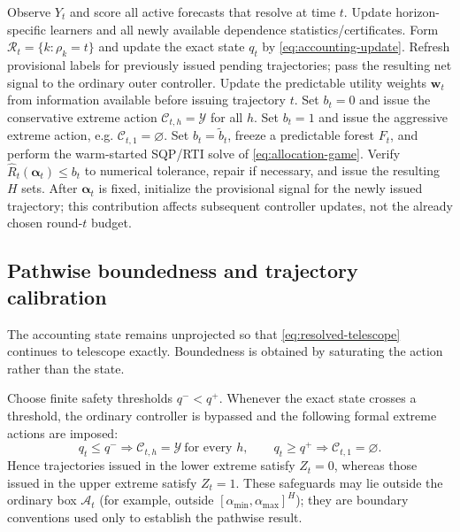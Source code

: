 \documentclass[11pt]{article}
\begin{document}
\begin{algorithm}[t]
\caption{Coverage-aware trajectory-risk allocation at physical time $t$}
\label{alg:online-allocation}
\begin{algorithmic}[1]
\STATE Observe $Y_t$ and score all active forecasts that resolve at time $t$.
\STATE Update horizon-specific learners and all newly available dependence
       statistics/certificates.
\STATE Form $\mathcal R_t=\{k:\rho_k=t\}$ and update the exact state $q_t$ by
       \eqref{eq:accounting-update}.
\STATE Refresh provisional labels for previously issued pending trajectories;
       pass the resulting net signal to the ordinary outer controller.
\STATE Update the predictable utility weights $\bm w_t$ from information
       available before issuing trajectory $t$.
    \STATE Set $b_t=0$ and issue the conservative extreme action
           $\mathcal C_{t,h}=\mathcal Y$ for all $h$.
    \STATE Set $b_t=1$ and issue the aggressive extreme action, e.g.
           $\mathcal C_{t,1}=\varnothing$.
\ELSE
    \STATE Set $b_t=\widetilde b_t$, freeze a predictable forest $F_t$, and
           perform the warm-started SQP/RTI solve of
           \eqref{eq:allocation-game}.
    \STATE Verify $\widehat R_t(\bm\alpha_t)\le b_t$ to numerical tolerance,
           repair if necessary, and issue the resulting $H$ sets.
\ENDIF
\STATE After $\bm\alpha_t$ is fixed, initialize the provisional signal for the
       newly issued trajectory; this contribution affects subsequent controller
       updates, not the already chosen round-$t$ budget.
\end{algorithmic}
\end{algorithm}

\subsection{Pathwise boundedness and trajectory calibration}

The accounting state remains unprojected so that
\eqref{eq:resolved-telescope} continues to telescope exactly.  Boundedness is
obtained by saturating the action rather than the state.

Choose finite safety thresholds $q^-<q^+$.  Whenever the exact state crosses a threshold, the ordinary controller is bypassed and the following formal extreme actions are imposed:
\[
    q_t\le q^-
    \Longrightarrow
    \mathcal C_{t,h}=\mathcal Y\ \text{for every }h,
    \qquad
    q_t\ge q^+
    \Longrightarrow
    \mathcal C_{t,1}=\varnothing.
\]
Hence trajectories issued in the lower extreme satisfy $Z_t=0$, whereas those
issued in the upper extreme satisfy $Z_t=1$.  These safeguards may lie outside
the ordinary box $\mathcal A_t$ (for example, outside
$[\alpha_{\min},\alpha_{\max}]^H$); they are boundary conventions used only to
establish the pathwise result.
\end{document}
